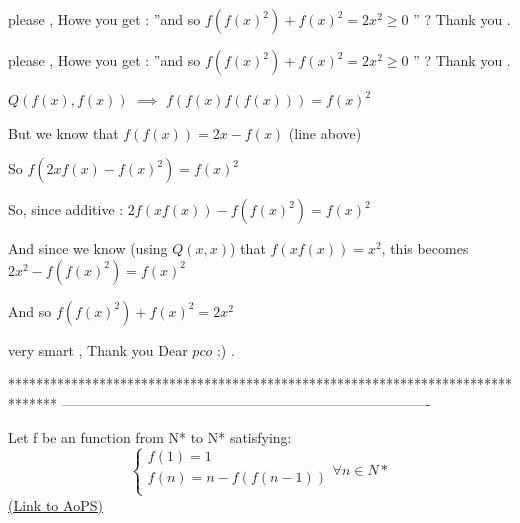\begin{solution}
	please , Howe you get : ''and so $f(f(x)^2)+f(x)^2=2x^2\ge 0$ ''  ? Thank you .
\end{solution}



\begin{solution}
	\begin{tcolorbox}please , Howe you get : ''and so $f(f(x)^2)+f(x)^2=2x^2\ge 0$ ''  ? Thank you .\end{tcolorbox}
$Q(f(x),f(x))$ $\implies$ $f(f(x)f(f(x)))=f(x)^2$

But we know that $f(f(x))=2x-f(x)$ (line above)

So $f(2xf(x)-f(x)^2)=f(x)^2$

So, since additive : $2f(xf(x))-f(f(x)^2)=f(x)^2$

And since we know (using $Q(x,x)$) that $f(xf(x))=x^2$, this becomes $2x^2-f(f(x)^2)=f(x)^2$

And so $f(f(x)^2)+f(x)^2=2x^2$
\end{solution}



\begin{solution}
	very smart , Thank you Dear $pco$ :) .
\end{solution}
*******************************************************************************
-------------------------------------------------------------------------------

\begin{problem}
	Let f be an function from N* to N* satisfying:
\[\left\{ {\begin{array}{*{20}{c}}
   {f(1) = 1}  \\
   {f(n) = n - f(f(n - 1))}  \\
\end{array}\forall n \in} N* \right.\]
	\flushright \href{https://artofproblemsolving.com/community/c6h474495}{(Link to AoPS)}
\end{problem}



